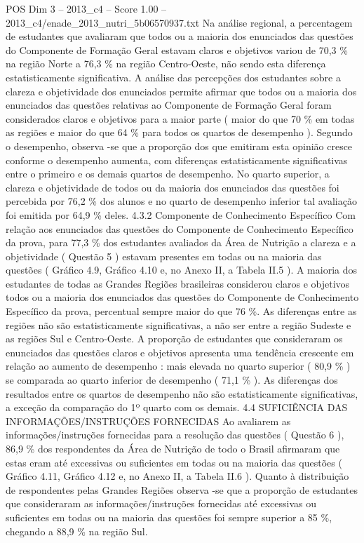 \begin{textsample}{POS Dim 3 – 2013\_c4 – Score 1.00 – 2013\_c4/enade\_2013\_nutri\_5b06570937.txt}
Na análise regional, a percentagem de estudantes que avaliaram que todos ou a maioria dos enunciados das questões do Componente de Formação Geral estavam claros e objetivos variou de 70,3 \% na região Norte a 76,3 \% na região Centro-Oeste, não sendo esta diferença estatisticamente significativa.
A análise das percepções dos estudantes sobre a clareza e objetividade dos enunciados permite afirmar que todos ou a maioria dos enunciados das questões relativas ao Componente de Formação Geral foram considerados claros e objetivos para a maior parte ( maior do que 70 \% em todas as regiões e maior do que 64 \% para todos os quartos de desempenho ).
Segundo o desempenho, observa -se que a proporção dos que emitiram esta opinião cresce conforme o desempenho aumenta, com diferenças estatisticamente significativas entre o primeiro e os demais quartos de desempenho.
No quarto superior, a clareza e objetividade de todos ou da maioria dos enunciados das questões foi percebida por 76,2 \% dos alunos e no quarto de desempenho inferior tal avaliação foi emitida por 64,9 \% deles. 4.3.2 Componente de Conhecimento Específico Com relação aos enunciados das questões do Componente de Conhecimento Específico da prova, para 77,3 \% dos estudantes avaliados da Área de Nutrição a clareza e a objetividade ( Questão 5 ) estavam presentes em todas ou na maioria das questões ( Gráfico 4.9, Gráfico 4.10 e, no Anexo II, a Tabela II.5 ).
A maioria dos estudantes de todas as Grandes Regiões brasileiras considerou claros e objetivos todos ou a maioria dos enunciados das questões do Componente de Conhecimento Específico da prova, percentual sempre maior do que 76 \%.
As diferenças entre as regiões não são estatisticamente significativas, a não ser entre a região Sudeste e as regiões Sul e Centro-Oeste.
A proporção de estudantes que consideraram os enunciados das questões claros e objetivos apresenta uma tendência crescente em relação ao aumento de desempenho : mais elevada no quarto superior ( 80,9 \% ) se comparada ao quarto inferior de desempenho ( 71,1 \% ).
As diferenças dos resultados entre os quartos de desempenho não são estatisticamente significativas, a exceção da comparação do 1º quarto com os demais. 4.4 SUFICIÊNCIA DAS INFORMAÇÕES/INSTRUÇÕES FORNECIDAS Ao avaliarem as informações/instruções fornecidas para a resolução das questões ( Questão 6 ), 86,9 \% dos respondentes da Área de Nutrição de todo o Brasil afirmaram que estas eram até excessivas ou suficientes em todas ou na maioria das questões ( Gráfico 4.11, Gráfico 4.12 e, no Anexo II, a Tabela II.6 ).
Quanto à distribuição de respondentes pelas Grandes Regiões observa -se que a proporção de estudantes que consideraram as informações/instruções fornecidas até excessivas ou suficientes em todas ou na maioria das questões foi sempre superior a 85 \%, chegando a 88,9 \% na região Sul.

\end{textsample}
